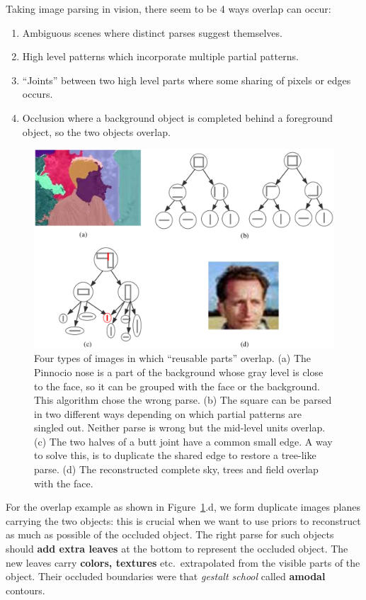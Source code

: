 \documentclass[10pt,oneside]{book}
\newcommand{\Fig}[1]{Figure~\ref{fig:#1}}
\begin{document}
Taking image parsing in vision, there seem to be 4 ways overlap can occur:
%
\begin{enumerate}
  \item Ambiguous scenes where distinct parses suggest themselves.
  \item High level patterns which incorporate multiple partial patterns.
  \item ``Joints'' between two high level parts where some sharing of pixels or
    edges occurs.
  \item Occlusion where a background object is completed behind a foreground
    object, so the two objects overlap.
\end{enumerate}
%
\pagebreak
%
\begin{figure}[!htpb]
  \centering
  \includegraphics[width=0.8\linewidth]{./fig/fig_ii_1_7.png}
  \caption{Four types of images in which ``reusable parts'' overlap. (a) The
    Pinnocio nose is a part of the background whose gray level is close to the
    face, so it can be grouped with the face or the background. This algorithm
    chose the wrong parse. (b) The square can be parsed in two different ways
    depending on which partial patterns are singled out. Neither parse is wrong
    but the mid-level units overlap. (c) The two halves of a butt joint have a
    common small edge. A way to solve this, is to duplicate the shared edge to
    restore a tree-like parse. (d) The reconstructed complete sky, trees and
    field overlap with the face.}%
  \label{fig:ii.1.7}
\end{figure}
%
For the overlap example as shown in \Fig{ii.1.7}.d, we form duplicate images
planes carrying the two objects: this is crucial when we want to use priors to
reconstruct as much as possible of the occluded object. The right parse for
such objects should \textbf{add extra leaves} at the bottom to represent the
occluded object. The new  leaves carry \textbf{colors, textures} etc.\,
extrapolated from the visible parts of the object. Their occluded boundaries
were that \textit{gestalt school} called \textbf{amodal} contours.
\end{document}
